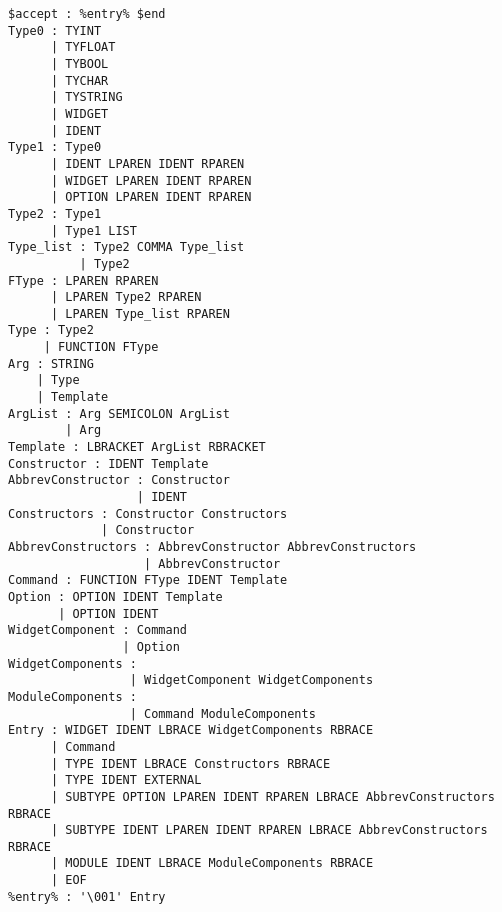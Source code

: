 \begin{verbatim}
$accept : %entry% $end
Type0 : TYINT
      | TYFLOAT
      | TYBOOL
      | TYCHAR
      | TYSTRING
      | WIDGET
      | IDENT
Type1 : Type0
      | IDENT LPAREN IDENT RPAREN
      | WIDGET LPAREN IDENT RPAREN
      | OPTION LPAREN IDENT RPAREN
Type2 : Type1
      | Type1 LIST
Type_list : Type2 COMMA Type_list
          | Type2
FType : LPAREN RPAREN
      | LPAREN Type2 RPAREN
      | LPAREN Type_list RPAREN
Type : Type2
     | FUNCTION FType
Arg : STRING
    | Type
    | Template
ArgList : Arg SEMICOLON ArgList
        | Arg
Template : LBRACKET ArgList RBRACKET
Constructor : IDENT Template
AbbrevConstructor : Constructor
                  | IDENT
Constructors : Constructor Constructors
             | Constructor
AbbrevConstructors : AbbrevConstructor AbbrevConstructors
                   | AbbrevConstructor
Command : FUNCTION FType IDENT Template
Option : OPTION IDENT Template
       | OPTION IDENT
WidgetComponent : Command
                | Option
WidgetComponents :
                 | WidgetComponent WidgetComponents
ModuleComponents :
                 | Command ModuleComponents
Entry : WIDGET IDENT LBRACE WidgetComponents RBRACE
      | Command
      | TYPE IDENT LBRACE Constructors RBRACE
      | TYPE IDENT EXTERNAL
      | SUBTYPE OPTION LPAREN IDENT RPAREN LBRACE AbbrevConstructors RBRACE
      | SUBTYPE IDENT LPAREN IDENT RPAREN LBRACE AbbrevConstructors RBRACE
      | MODULE IDENT LBRACE ModuleComponents RBRACE
      | EOF
%entry% : '\001' Entry
\end{verbatim}
